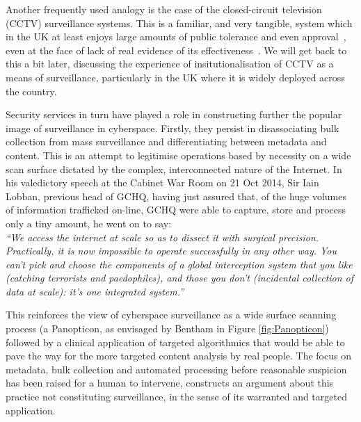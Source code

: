 \documentclass{llncs}
\begin{document}
Another frequently used analogy is the case of the closed-circuit television (CCTV) surveillance systems. This is a familiar, and very tangible, system which in the UK at least enjoys large amounts of public tolerance and even approval~\cite{Ditton}, even at the face of lack of real evidence of its effectiveness~\cite{Woodhouse}. We will get back to this a bit later, discussing the experience of insitutionalisation of CCTV as a means of surveillance, particularly in the UK where it is widely deployed across the country.

Security services in turn have played a role in constructing further the popular image of surveillance in cyberspace. Firstly, they persist in disassociating bulk collection from mass surveillance and differentiating between metadata and content. This is an attempt to legitimise operations based by necessity on a wide scan surface dictated by the complex, interconnected nature of the Internet. In his valedictory speech at the Cabinet War Room on 21 Oct 2014, Sir Iain Lobban, previous head of GCHQ, having just assured that, of the huge volumes of information trafficked on-line, GCHQ were able to capture, store and process only a tiny amount, he went on to say:\\
\emph{``We access the internet at scale so as to dissect it with surgical precision. Practically, it is now impossible to operate successfully in any other way. You can't pick and choose the components of a global interception system that you like (catching terrorists and paedophiles), and those you don't (incidental collection of data at scale): it's one integrated system.''}~\cite{Lobban}

This reinforces the view of cyberspace surveillance as a wide surface scanning process (a Panopticon, as envisaged by Bentham in Figure \ref{fig:Panopticon}) followed by a clinical application of targeted algorithmics that would be able to pave the way for the more targeted content analysis by real people. The focus on metadata, bulk collection and automated processing before reasonable suspicion has been raised for a human to intervene, constructs an argument about this practice not constituting surveillance, in the sense of its warranted and targeted application.
\end{document}
